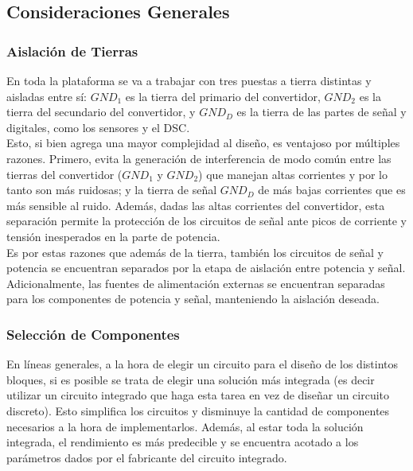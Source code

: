 \subsection{Consideraciones Generales}

\subsubsection{Aislación de Tierras}

En toda la plataforma se va a trabajar con tres puestas a tierra distintas y aisladas entre sí: $GND_1$ es la tierra del primario del convertidor, $GND_2$ es la tierra del secundario del convertidor, y $GND_D$ es la tierra de las partes de señal y digitales, como los sensores y el DSC.\\

Esto, si bien agrega una mayor complejidad al diseño, es ventajoso por múltiples razones. Primero, evita la generación de interferencia de modo común entre las tierras del convertidor ($GND_1$ y $GND_2$) que manejan altas corrientes y por lo tanto son más ruidosas; y la tierra de señal $GND_D$ de más bajas corrientes que es más sensible al ruido. Además, dadas las altas corrientes del convertidor, esta separación permite la protección de los circuitos de señal ante picos de corriente y tensión inesperados en la parte de potencia.\\

Es por estas razones que además de la tierra, también los circuitos de señal y potencia se encuentran separados por la etapa de aislación entre potencia y señal. Adicionalmente, las fuentes de alimentación externas se encuentran separadas para los componentes de potencia y señal, manteniendo la aislación deseada.\\

\subsubsection{Selección de Componentes}

En líneas generales, a la hora de elegir un circuito para el diseño de los distintos bloques, si es posible se trata de elegir una solución más integrada (es decir utilizar un circuito integrado que haga esta tarea en vez de diseñar un circuito discreto). Esto simplifica los circuitos y disminuye la cantidad de componentes necesarios a la hora de implementarlos. Además, al estar toda la solución integrada, el rendimiento es más predecible y se encuentra acotado a los parámetros dados por el fabricante del circuito integrado.\\

